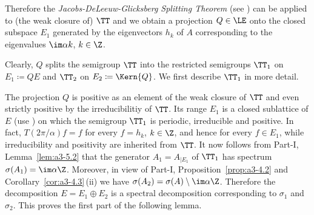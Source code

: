 Therefore the \emph{Jacobs-DeLeeuw-Glicksberg Splitting Theorem} (see \textcite[Chapter 2, Theorem 4.4 and 4.5]{krengel:1985}) can be applied to (the weak closure of) $\TT$ and we obtain a projection $Q \in \LE$ onto the closed subspace $E_{1}$ generated by the eigenvectors $h_{k}$ of\/ $A$ corresponding to the eigenvalues $\im\alpha k$, $k \in \Z$.

Clearly, $Q$ splits the semigroup $\TT$ into the restricted semigroups $\TT_{1}$ on $E_{1} \coloneqq QE$ and $\TT_{2}$ on $E_{2} \coloneqq \Kern{Q}$.
We first describe $\TT_{1}$ in more detail.

The projection $Q$ is positive as an element of the weak closure of\/ $\TT$ and even strictly positive by the irreducibilitiy of\/ $\TT$.
Its range $E_{1}$ is a closed sublattice of\/ $E$ (use \textcite[Proposition III.11.5]{schaefer:1974}) on which the semigroup $\TT_{1}$ is periodic, irreducible and positive.
In fact, $T(2\pi/\alpha)f = f$ for every $f = h_{k}$, $k \in \Z$, and hence for every $f \in E_{1}$, while irreducibility and positivity are inherited from $\TT$.
It now follows from 
Part-I, Lemma~\ref{lem:a3-5.2}
that the generator $A_{1} = A_{|E_{1}}$ of\/ $\TT_{1}$ has spectrum $\sigma(A_{1}) = \im\alpha\Z$.
Moreover, in view of 
Part-I, Proposition~\ref{prop:a3-4.2} and Corollary~\ref{cor:a3-4.3}\,(ii) 
we have $\sigma(A_{2}) = \sigma(A) \setminus \im\alpha\Z$.
Therefore the decomposition $E = E_{1} \oplus E_{2}$ is a spectral decomposition corresponding to $\sigma_{1}$ and $\sigma_{2}$.
This proves the first part of the following lemma.

